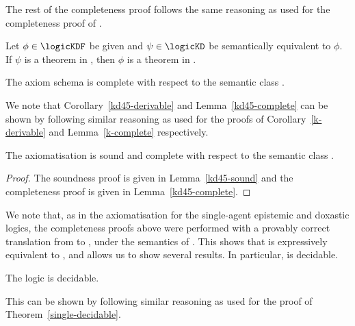 The rest of the completeness proof follows the same reasoning as used for the
completeness proof of \axiomKF{}.

\begin{corollary}\label{kd45-derivable}
Let $\phi \in \logicKDF$ be given and $\psi \in \logicKD$ be semantically
equivalent to $\phi$.  If $\psi$ is a theorem in \logicKD{}, then $\phi$ is a
theorem in \axiomKDF{}.
\end{corollary}

\begin{lemma}\label{kd45-complete}
The axiom schema \axiomKDF{} is complete with respect to the semantic class
\classKD{}.
\end{lemma}

We note that Corollary~\ref{kd45-derivable} and Lemma~\ref{kd45-complete} can be
shown by following similar reasoning as used for the proofs of
Corollary~\ref{k-derivable} and Lemma~\ref{k-complete} respectively.

\begin{theorem}
The axiomatisation \axiomKDF{} is sound and complete with respect to the
semantic class \classKD{}.
\end{theorem}

\begin{proof}
The soundness proof is given in Lemma~\ref{kd45-sound} and the completeness
proof is given in Lemma~\ref{kd45-complete}.
\end{proof}

We note that, as in the axiomatisation for the single-agent epistemic and
doxastic logics, the completeness proofs above were performed with a provably
correct translation from \langF{} to \lang{}, under the semantics of
\logicKDF{}. This shows that \logicKDF{} is expressively equivalent to
\logicKD{}, and allows us to show several results. In particular, \logicKDF{} is
decidable.

\begin{theorem}
The logic \logicKDF{} is decidable.
\end{theorem}

This can be shown by following similar reasoning as used for the proof of
Theorem~\ref{single-decidable}.
